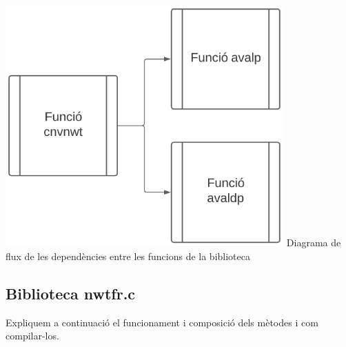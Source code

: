 \documentclass[12pt]{report}
\begin{document}
\begin{center}
    \includegraphics[width=0.8\textwidth]{diarama_dependencies.PNG}
    \newline
Diagrama de flux de les dependències entre les funcions de la biblioteca
\label{fig:UML_funcionsgeneral}
\end{center}



\subsection{Biblioteca nwtfr.c}
Expliquem a continuació el funcionament i composició dels mètodes i com compilar-los.

\end{document}
